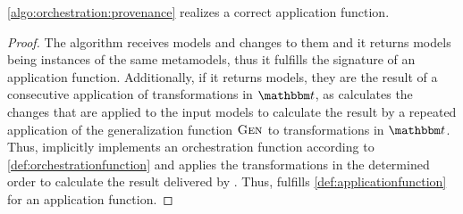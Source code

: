 \begin{theorem} \label{theorem:provenance_correctness}
    \autoref{algo:orchestration:provenance} realizes a correct application function.
\end{theorem}
\begin{proof}
    The algorithm receives models and changes to them and it returns models being instances of the same metamodels, thus it fulfills the signature of an application function.
    Additionally, if it returns models, they are the result of a consecutive application of transformations in $\transformationset{T}$, as  calculates the changes that are applied to the input models to calculate the result by a repeated application of the generalization function $\textsc{Gen}_{}$ to transformations in $\transformationset{T}$.
    Thus,  implicitly implements an orchestration function according to \autoref{def:orchestrationfunction} and applies the transformations in the determined order to calculate the result delivered by .
    Thus,  fulfills \autoref{def:applicationfunction} for an application function.


\end{proof}
